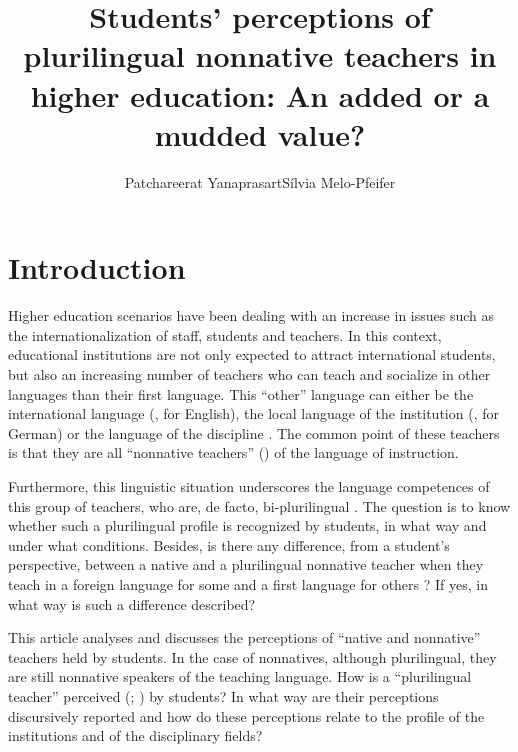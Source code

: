 \documentclass[output=paper]{../langscibook}
\author{Patchareerat Yanaprasart\affiliation{University of Geneva}\orcid{}\lastand Sílvia Melo-Pfeifer \affiliation{University of Hamburg}}
\title{Students’ perceptions of plurilingual nonnative teachers in higher education: An added or a mudded value?}
\begin{document}
\maketitle 
{}%




\section{Introduction}

Higher education scenarios have been dealing with an increase in issues such as the internationalization of staff, students and teachers. In this context, educational institutions are not only expected to attract international students, but also an increasing number of teachers who can teach and socialize in other languages than their first language. This “other” language can either be the international language (\citealt{Mueller2018}, for English), the local language of the institution (\citealt{Melo-Pfeifer2017}, for German) or the language of the discipline \citep{Yanaprasart2019}. The common point of these teachers is that they are all “nonnative teachers” (\citealt{DervinBadrinathan2011}) of the language of instruction.

Furthermore, this linguistic situation underscores the language competences of this group of teachers, who are, de facto, bi-plurilingual \citep{Mueller2018}. The question is to know whether such a plurilingual profile is recognized by students, in what way and under what conditions. Besides, is there any difference, from a student’s perspective, between a native and a plurilingual nonnative teacher when they teach in a foreign language for some and a first language for others \citep{Taillefer2004}? If yes, in what way is such a difference described? 

This article analyses and discusses the perceptions of “native and nonnative” teachers held by students. In the case of nonnatives, although plurilingual, they are still nonnative speakers of the teaching language. How is a “plurilingual teacher” perceived (\citealt{Llurda2005}; \citealt{VargheseEtAl2005}) by students? In what way are their perceptions discursively reported \citep{Miller2010} and how do these perceptions relate to the profile of the institutions and of the disciplinary fields?
\end{document}
